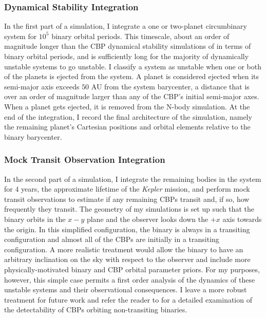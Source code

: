 \subsubsection{Dynamical Stability Integration}

In the first part of a simulation, I integrate a one or two-planet circumbinary system for $10^5$ binary orbital periods.  This timescale, about an order of magnitude longer than the CBP dynamical stability simulations of \citet{Holman1999} in terms of binary orbital periods, and is sufficiently long for the majority of dynamically unstable systems to go unstable.  I classify a system as unstable when one or both of the planets is ejected from the system.  A planet is considered ejected when its semi-major axis exceeds $50$ AU from the system barycenter, a distance that is over an order of magnitude larger than any of the CBP's initial semi-major axes.  When a planet gets ejected, it is removed from the N-body simulation.  At the end of the integration, I record the final architecture of the simulation, namely the remaining planet's Cartesian positions and orbital elements relative to the binary barycenter.  

\subsubsection{Mock Transit Observation Integration}

In the second part of a simulation, I integrate the remaining bodies in the system for $4$ years, the approximate lifetime of the \textit{Kepler} mission, and perform mock transit observations to estimate if any remaining CBPs transit and, if so, how frequently they transit.  The geometry of my simulations is set up such that the binary orbits in the $x-y$ plane and the observer looks down the $+x$ axis towards the origin.  In this simplified configuration, the binary is always in a transiting configuration and almost all of the CBPs are initially in a transiting configuration.  A more realistic treatment would allow the binary to have an arbitrary inclination on the sky with respect to the observer and include more physically-motivated binary and CBP orbital parameter priors.  For my purposes, however, this simple case permits a first order analysis of the dynamics of these unstable systems and their observational consequences. I leave a more robust treatment for future work and refer the reader to \citet{Martin2014} for a detailed examination of the detectability of CBPs orbiting non-transiting binaries.

